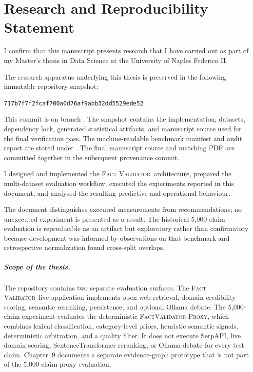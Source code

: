 \documentclass[12pt,a4paper,openany]{report}
\newcommand{\system}{\textsc{Fact Validator}}
\newcommand{\proxy}{\textsc{FactValidator-Proxy}}
\begin{document}
\chapter*{Research and Reproducibility Statement}
I confirm that this manuscript presents research that I have carried out as part of my Master's thesis in Data Science at the University of Naples Federico II.

The research apparatus underlying this thesis is preserved in the following
immutable repository snapshot:
\begin{center}
\small\texttt{717b7f7f2fcaf700a0d76af9abb32dd5529ede52}
\end{center}
This commit is on branch . The snapshot contains the
implementation, datasets, dependency lock, generated statistical artifacts,
and manuscript source used for the final verification pass. The
machine-readable benchmark manifest and audit report are stored under
. The final manuscript source and matching
PDF are committed together in the subsequent provenance commit.

I designed and implemented the \system\ architecture, prepared the multi-dataset evaluation workflow, executed the experiments reported in this document, and analysed the resulting predictive and operational behaviour.

The document distinguishes executed measurements from recommendations; no
unexecuted experiment is presented as a result. The historical 5{,}000-claim
evaluation is reproducible as an artifact but exploratory rather than
confirmatory because development was informed by observations on that
benchmark and retrospective normalization found cross-split overlaps.

\paragraph{Scope of the thesis.} The repository contains two separate evaluation surfaces. The \system\ live application implements open-web retrieval, domain credibility scoring, semantic reranking, persistence, and optional Ollama debate. The 5{,}000-claim experiment evaluates the deterministic \proxy, which combines lexical classification, category-level priors, heuristic semantic signals, deterministic arbitration, and a quality filter. It does not execute SerpAPI, live domain scoring, SentenceTransformer reranking, or Ollama debate for every test claim. Chapter~9 documents a separate evidence-graph prototype that is not part of the 5{,}000-claim proxy evaluation.
\end{document}
